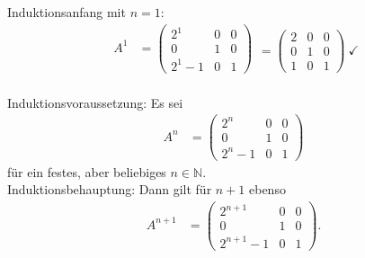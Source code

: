 \documentclass[main.tex]{subfiles}
\begin{document}
Induktionsanfang mit $n = 1$:
\begin{equation*}
    \begin{aligned}
        A^1 & = \begin{pmatrix}
            2^1 & 0 & 0 \\
            0 & 1 & 0 \\
            2^1 -1 & 0 & 1
        \end{pmatrix}\\
    \end{aligned} = \begin{pmatrix}
        2 & 0 & 0 \\
        0 & 1 & 0 \\
        1 & 0 & 1
    \end{pmatrix}\ \checkmark
\end{equation*}

Induktionsvoraussetzung: Es sei 
\begin{equation*}
    \begin{aligned}
        A^n & = \begin{pmatrix}
            2^n & 0 & 0 \\
            0 & 1 & 0 \\
            2^n -1 & 0 & 1
        \end{pmatrix}
    \end{aligned}
\end{equation*}
für ein festes, aber beliebiges $n \in \mathbb{N}$.\\

Induktionsbehauptung: Dann gilt für $n+1$ ebenso
\begin{equation*}
    \begin{aligned}
        A^{n+1} & = \begin{pmatrix}
            2^{n+1} & 0 & 0 \\
            0 & 1 & 0 \\
            2^{n+1} -1 & 0 & 1
        \end{pmatrix}.
    \end{aligned}
\end{equation*}
\end{document}
